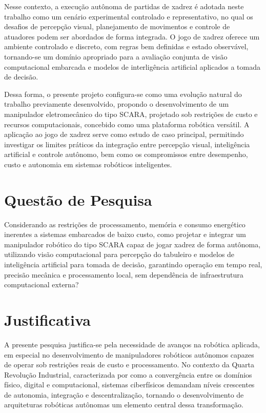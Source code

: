 Nesse contexto, a execução autônoma de partidas de xadrez é adotada neste trabalho como um cenário experimental controlado e representativo, no qual os desafios de percepção visual, planejamento de movimentos e controle de atuadores podem ser abordados de forma integrada. O jogo de xadrez oferece um ambiente controlado e discreto, com regras bem definidas e estado observável, tornando-se um domínio apropriado para a avaliação conjunta de visão computacional embarcada e modelos de interligência artificial aplicados a tomada de decisão.

Dessa forma, o presente projeto configura-se como uma evolução natural do trabalho previamente desenvolvido, propondo o desenvolvimento de um manipulador eletromecânico do tipo SCARA, projetado sob restrições de custo e recursos computacionais, concebido como uma plataforma robótica versátil. A aplicação ao jogo de xadrez serve como estudo de caso principal, permitindo investigar os limites práticos da integração entre percepção visual, inteligência artificial e controle autônomo, bem como os compromissos entre desempenho, custo e autonomia em sistemas robóticos inteligentes.

\section*{Questão de Pesquisa}

Considerando as restrições de processamento, memória e consumo energético inerentes a sistemas embarcados de baixo custo, como projetar e integrar um manipulador robótico do tipo SCARA capaz de jogar xadrez de forma autônoma, utilizando visão computacional para percepção do tabuleiro e modelos de inteligência artificial para tomada de decisão, garantindo operação em tempo real, precisão mecânica e processamento local, sem dependência de infraestrutura computacional externa?

\section*{Justificativa}

A presente pesquisa justifica-se pela necessidade de avanços na robótica aplicada, em especial no desenvolvimento de manipuladores robóticos autônomos capazes de operar sob restrições reais de custo e processamento. No contexto da Quarta Revolução Industrial, caracterizada por  como a convergência entre os domínios físico, digital e computacional, sistemas ciberfísicos demandam níveis crescentes de autonomia, integração e descentralização, tornando o desenvolvimento de arquiteturas robóticas autônomas um elemento central dessa transformação.

